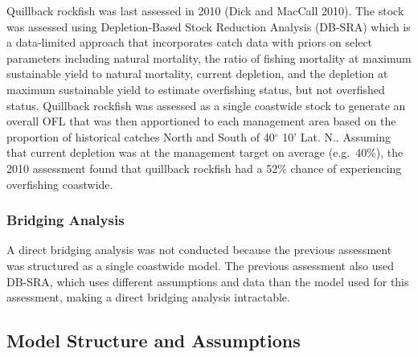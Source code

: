 \documentclass[11pt,
  english,
  a4paper,
]{article}
\begin{document}
\leavevmode\tagmcend\tagstructend


Quillback rockfish was last assessed in 2010 {(Dick and MacCall 2010)\leavevmode\tagmcend\tagstructend}. The stock was assessed using Depletion-Based Stock Reduction Analysis (DB-SRA) which is a data-limited approach that incorporates catch data with priors on select parameters including natural mortality, the ratio of fishing mortality at maximum sustainable yield to natural mortality, current depletion, and the depletion at maximum sustainable yield to estimate overfishing status, but not overfished status. Quillback rockfish was assessed as a single coastwide stock to generate an overall OFL that was then apportioned to each management area based on the proportion of historical catches North and South of 40{\(^\circ\)\leavevmode\tagmcend\tagstructend} 10' Lat. N.. Assuming that current depletion was at the management target on average (e.g.~40\%), the 2010 assessment found that quillback rockfish had a 52\% chance of experiencing overfishing coastwide.

\leavevmode\tagmcend\tagstructend\par


\hypertarget{bridging-analysis}{%
\subsubsection{Bridging Analysis}\label{bridging-analysis}}

\leavevmode\tagmcend\tagstructend


A direct bridging analysis was not conducted because the previous assessment was structured as a single coastwide model. The previous assessment also used DB-SRA, which uses different assumptions and data than the model used for this assessment, making a direct bridging analysis intractable.

\leavevmode\tagmcend\tagstructend\par


\hypertarget{model-structure-and-assumptions}{%
\subsection{Model Structure and Assumptions}\label{model-structure-and-assumptions}}
\end{document}
